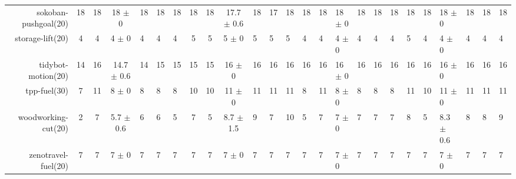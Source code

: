\begin{center}
\begin{tabular}{|rcccHHH|cccHHHHHHHHHHHHHHH|}
sokoban-pushgoal(20) & 18 & 18 & 18 $\pm$ 0 & 18 & 18 & 18 & 18 & 18 & 17.7 $\pm$ 0.6 & 18 & 17 & 18 & 18 & 18 & 18 $\pm$ 0 & 18 & 18 & 18 & 18 & 18 & 18 $\pm$ 0 & 18 & 18 & 18\\
storage-lift(20) & 4 & 4 & 4 $\pm$ 0 & 4 & 4 & 4 & 5 & 5 & 5 $\pm$ 0 & 5 & 5 & 5 & 4 & 4 & 4 $\pm$ 0 & 4 & 4 & 4 & 5 & 4 & 4 $\pm$ 0 & 4 & 4 & 4\\
tidybot-motion(20) & 14 & 16 & 14.7 $\pm$ 0.6 & 14 & 15 & 15 & 15 & 15 & 16 $\pm$ 0 & 16 & 16 & 16 & 16 & 16 & 16 $\pm$ 0 & 16 & 16 & 16 & 16 & 16 & 16 $\pm$ 0 & 16 & 16 & 16\\
tpp-fuel(30) & 7 & 11 & 8 $\pm$ 0 & 8 & 8 & 8 & 10 & 10 & 11 $\pm$ 0 & 11 & 11 & 11 & 8 & 11 & 8 $\pm$ 0 & 8 & 8 & 8 & 11 & 10 & 11 $\pm$ 0 & 11 & 11 & 11\\
woodworking-cut(20) & 2 & 7 & 5.7 $\pm$ 0.6 & 6 & 6 & 5 & 7 & 5 & 8.7 $\pm$ 1.5 & 9 & 7 & 10 & 5 & 7 & 7 $\pm$ 0 & 7 & 7 & 7 & 8 & 5 & 8.3 $\pm$ 0.6 & 8 & 8 & 9\\
zenotravel-fuel(20) & 7 & 7 & 7 $\pm$ 0 & 7 & 7 & 7 & 7 & 7 & 7 $\pm$ 0 & 7 & 7 & 7 & 7 & 7 & 7 $\pm$ 0 & 7 & 7 & 7 & 7 & 7 & 7 $\pm$ 0 & 7 & 7 & 7\\
\end{tabular}
\end{center}
